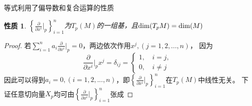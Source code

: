 \documentclass{article}
\newtheorem{proposition}{性质}
\begin{document}
等式利用了偏导数和复合运算的性质
\begin{proposition}
    $\left\{\frac{\partial}{\partial x^i}|_{p}\right\}_{i=1}^{n}$为$T_p(M)$的一组基，且${\rm dim}(T_pM)={\rm dim}(M)$
\end{proposition}
\begin{proof}
    若$\sum_{i = 1}^{n}a_i \frac{\partial}{\partial x^i}|_{p}=0$，两边依次作用$x^j,(j=1,2,...,n)$，
    因为
    $$
    \frac{\partial}{\partial x^i}|_{p}x^j=\delta_{ij}=\begin{cases}
        1,\quad i=j,\\
        0,\quad i \neq j
    \end{cases}
    $$
    因此可以得到$a_i=0,(i=1,2,...,n)$，即$\left\{\frac{\partial}{\partial x^i}|_{p}\right\}_{i=1}^{n}$在$T_p(M)$中线性无关。
    下证任意切向量$X_{p}$均可由$\left\{\frac{\partial}{\partial x^i}|_{p}\right\}_{i=1}^{n}$张成
\end{proof}
\end{document}
